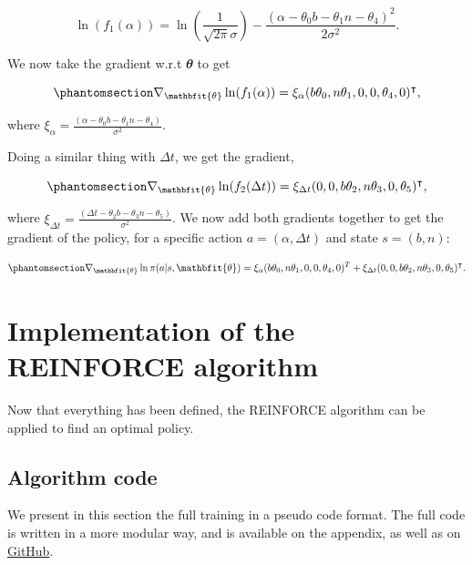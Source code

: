 \documentclass[
  letterpaper,
]{report}
\theoremstyle{definition}
\theoremstyle{plain}
\theoremstyle{definition}
\theoremstyle{remark}
\begin{document}
\[
\ln(f_1(\alpha)) = \ln(\frac{1}{\sqrt{2\pi}\sigma}) - \frac{(\alpha - \theta_0b-\theta_1n-\theta_4)^2}{2\sigma^2}.
\]

We now take the gradient w.r.t \(\mathbfit{\theta}\) to get

\begin{equation}\phantomsection\label{eq-nabla_xi_alpha}{
\nabla_{\mathbfit{\theta}} \ln(f_1(\alpha)) = \xi_\alpha (b\theta_0,n\theta_1,0,0,\theta_4,0)^\intercal,
}\end{equation}

where
\(\xi_\alpha = \frac{(\alpha - \theta_0b-\theta_1n-\theta_4)}{\sigma^2}\).

Doing a similar thing with \(\Delta t\), we get the gradient,

\begin{equation}\phantomsection\label{eq-nabla_xi_delta_t}{
\nabla_{\mathbfit{\theta}} \ln(f_2(\Delta t)) = \xi_{\Delta t}(0,0,b\theta_2,n\theta_3,0,\theta_5)^\intercal,
}\end{equation}

where
\(\xi_{\Delta t} = \frac{(\Delta t - \theta_2b-\theta_3n-\theta_5)}{\sigma^2}\).
We now add both gradients together to get the gradient of the policy,
for a specific action \(a = (\alpha, \Delta t)\) and state \(s=(b,n)\):

\begin{equation}\phantomsection\label{eq-policyGradient}{
\nabla_{\mathbfit{\theta}} \ln\pi(a|s,{\mathbfit{\theta}}) =  \xi_\alpha (b\theta_0,n\theta_1,0,0,\theta_4,0)^T+ \xi_{\Delta t}(0,0,b\theta_2,n\theta_3,0,\theta_5)^\intercal.
}\end{equation}

\section{Implementation of the REINFORCE
algorithm}\label{implementation-of-the-reinforce-algorithm}

Now that everything has been defined, the REINFORCE algorithm can be
applied to find an optimal policy.

\subsection{Algorithm code}\label{algorithm-code}

We present in this section the full training in a pseudo code format.
The full code is written in a more modular way, and is available on the
appendix, as well as on
\href{https://github.com/MelanieInky/ThesisBook}{GitHub}.
\end{document}
